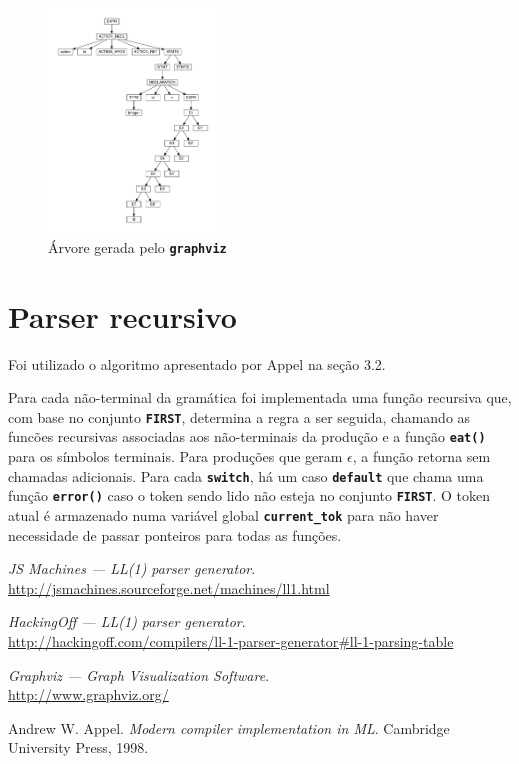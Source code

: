\documentclass[12pt, a4paper]{article}
\newcommand{\ic}[1]{\textbf{\lstinline{#1}}}
\begin{document}
\begin{figure}[h]
    \centering
    \includegraphics[width=0.40\textwidth]{graph}
    \caption{Árvore gerada pelo \ic{graphviz}}
    \label{fig:graph_1}
\end{figure}

\section{Parser recursivo}
Foi utilizado o algoritmo apresentado por Appel \cite{modern} na seção 3.2.

Para cada não-terminal da gramática foi implementada uma função recursiva que,
com base no conjunto \ic{FIRST}, determina a regra a ser seguida, chamando as
funcões recursivas associadas aos não-terminais da produção e a função
\ic{eat()} para os símbolos terminais. Para produções que geram $ \epsilon $, a
função retorna sem chamadas adicionais. Para cada \ic{switch}, há um caso
\ic{default} que chama uma função \ic{error()} caso o token sendo lido não
esteja no conjunto \ic{FIRST}. O token atual é armazenado numa
variável global \ic{current_tok} para não haver necessidade de passar ponteiros
para todas as funções.

\begin{thebibliography}{9}

\textit{JS Machines --- LL(1) parser generator}. \\
\url{http://jsmachines.sourceforge.net/machines/ll1.html}

\textit{HackingOff --- LL(1) parser generator}. \\
\url{http://hackingoff.com/compilers/ll-1-parser-generator#ll-1-parsing-table}

\textit{Graphviz --- Graph Visualization Software}. \\
\url{http://www.graphviz.org/}

Andrew W. Appel.
\textit{Modern compiler implementation in ML}.
Cambridge University Press, 1998.

\end{thebibliography}
\end{document}
